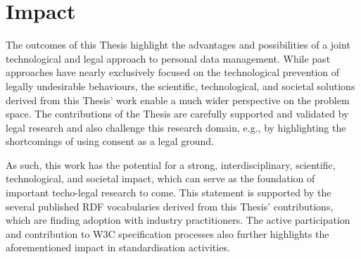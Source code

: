 \section{Impact}
\label{sec:impact}

The outcomes of this Thesis highlight the advantages and possibilities of a joint technological and legal approach to personal data management.
While past approaches have nearly exclusively focused on the technological prevention of legally undesirable behaviours, the scientific, technological, and societal solutions derived from this Thesis' work enable a much wider perspective on the problem space.
The contributions of the Thesis are carefully supported and validated by legal research and also challenge this research domain, e.g., by highlighting the shortcomings of using consent as a legal ground.

As such, this work has the potential for a strong, interdisciplinary, scientific, technological, and societal impact, which can serve as the foundation of important techo-legal research to come.
This statement is supported by the several published RDF vocabularies derived from this Thesis' contributions, which are finding adoption with industry practitioners.
The active participation and contribution to W3C specification processes also further highlights the aforementioned impact in standardisation activities.